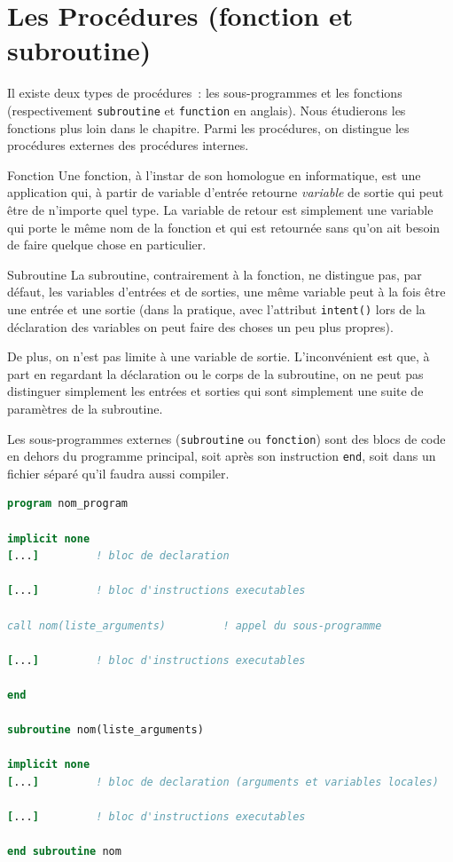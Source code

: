 \documentclass[a4paper,twoside]{article}
\begin{document}
\section{Les Procédures (fonction et subroutine)}
Il existe deux types de procédures~: les sous-programmes et les fonctions (respectivement \texttt{subroutine} et \texttt{function} en anglais). Nous étudierons les fonctions plus loin dans le chapitre. Parmi les procédures, on distingue les procé\-dures externes des procédures internes.

\begin{definition}{Fonction}
Une fonction, à l'instar de son homologue en informatique, est une application qui, à partir de variable d'entrée retourne \emph{variable} de sortie qui peut être de n'importe quel type. La variable de retour est simplement une variable qui porte le même nom de la fonction et qui est retournée sans qu'on ait besoin de faire quelque chose en particulier.
\end{definition}

\begin{definition}{Subroutine}
La subroutine, contrairement à la fonction, ne distingue pas, par défaut, les variables d'entrées et de sorties, une même variable peut à la fois être une entrée et une sortie (dans la pratique, avec l'attribut \texttt{intent()} lors de la déclaration des variables on peut faire des choses un peu plus propres). 

De plus, on n'est pas limite à une variable de sortie. L'inconvénient est que, à part en regardant la déclaration ou le corps de la subroutine, on ne peut pas distinguer simplement les entrées et sorties qui sont simplement une suite de paramètres de la subroutine.
\end{definition}


\bigskip

Les sous-programmes externes (\texttt{subroutine} ou \texttt{fonction}) sont des blocs de code en dehors du programme principal, soit après son instruction \texttt{end}, soit dans un fichier séparé qu'il faudra aussi compiler. 
\begin{lstlisting}[language=Fortran]
program nom_program
 
implicit none 
[...]         ! bloc de declaration
 
[...]         ! bloc d'instructions executables
 
call nom(liste_arguments)         ! appel du sous-programme
 
[...]         ! bloc d'instructions executables
 
end  

subroutine nom(liste_arguments)

implicit none 
[...]         ! bloc de declaration (arguments et variables locales)

[...]         ! bloc d'instructions executables
 
end subroutine nom 
\end{lstlisting}
\end{document}
